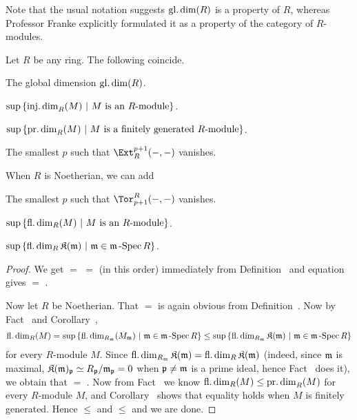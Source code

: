 \documentclass[a4paper,parskip=half,numbers=enddot, DIV=12]{scrreprt}
\begin{document}
Note that the usual notation suggests $\operatorname{gl.dim}(R)$ is a property of $R$, whereas Professor Franke explicitly formulated it as a property of the category of $R$-modules.
\begin{cor}
	Let $R$ be any ring. The following coincide.
	\begin{alphanumerate}
		\item The global dimension $\operatorname{gl.dim}(R)$.
		\item $\sup\left\{\operatorname{inj.dim}_R(M)\ \middle|\  M\text{ is an }R\text{-module}\right\}$.
		\item $\sup\left\{\operatorname{pr.dim}_R(M)\ \middle|\  M\text{ is a finitely generated }R\text{-module}\right\}$.
		\item The smallest $p$ such that $\Ext_R^{p+1}(-,-)$ vanishes.
	\end{alphanumerate}
	When $R$ is Noetherian, we can add 
	\begin{alphanumerate}\setcounter{enumi}{3}
		\item The smallest $p$ such that $\Tor_{p+1}^R(-,-)$ vanishes.
		\item $\sup\left\{\operatorname{fl.dim}_R(M)\ \middle|\  M\text{ is an }R\text{-module}\right\}$.
		\item $\sup\left\{\operatorname{fl.dim}_R\mathfrak{K}(\mathfrak{m})\ \middle|\ \mathfrak{m}\in\mathfrak{m}\operatorname{-Spec} R\right\}$.
	\end{alphanumerate}
\end{cor}
\begin{proof}
	We get  $=$  $=$  (in this order) immediately from Definition~ and equation  gives  $=$ .
	
	Now let $R$ be Noetherian. That  $=$  is again obvious from Definition~. Now by Fact~ and Corollary~,
	\begin{align*}
	\operatorname{fl.dim}_R(M)=\sup\left\{\operatorname{fl.dim}_{R_{\mathfrak{m}}}(M_{\mathfrak{m}})\ \middle|\ \mathfrak{m}\in\mathfrak{m}\operatorname{-Spec} R\right\}\leq\sup\left\{\operatorname{fl.dim}_{R_{\mathfrak{m}}}\mathfrak{K}(\mathfrak{m})\ \middle|\ \mathfrak{m}\in\mathfrak{m}\operatorname{-Spec} R\right\}
	\end{align*}
	for every $R$-module $M$. Since $\operatorname{fl.dim}_{R_{\mathfrak{m}}}\mathfrak{K}(\mathfrak{m})=\operatorname{fl.dim}_R\mathfrak{K}(\mathfrak{m})$ (indeed, since $\mathfrak{m}$ is maximal, $\mathfrak{K}(\mathfrak{m})_{\mathfrak{p}}\simeq R_{\mathfrak{p}}/\mathfrak{m}_{\mathfrak{p}}=0$ when $\mathfrak{p}\neq\mathfrak{m}$ is a prime ideal, hence Fact~ does it), we obtain that  $=$ . Now from Fact~ we know $\operatorname{fl.dim}_R(M)\leq \operatorname{pr.dim}_R(M)$ for every $R$-module $M$, and Corollary~ shows that equality holds when $M$ is finitely generated. Hence  $\leq$  and  $\leq$  and we are done.
\end{proof}
\end{document}
